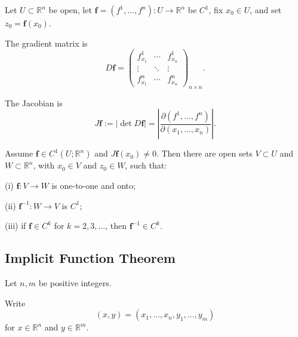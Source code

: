 Let $U\subset\mathbb R^n$ be open, let $\mathbf f=(f^1,\ldots,f^n):U\to\mathbb R^n$ be $C^1$, fix $x_0\in U$, and set $z_0=\mathbf f(x_0)$.

\begin{definition}
\label{def:gradient-matrix-df-square-notation}

The gradient matrix is
\[
D\mathbf f=
\begin{pmatrix}
f^1_{x_1}&\cdots&f^1_{x_n}\\
\vdots&\ddots&\vdots\\
f^n_{x_1}&\cdots&f^n_{x_n}
\end{pmatrix}_{n\times n}.
\]
\end{definition}

\begin{definition}
\label{def:jacobian-jf}

The Jacobian is
\[
J\mathbf f
:=|\det D\mathbf f|
=\left|\frac{\partial(f^1,\ldots,f^n)}
{\partial(x_1,\ldots,x_n)}\right|.
\]
\end{definition}

\begin{theorem}
\label{thm:inverse-function-theorem}

Assume $\mathbf f\in C^1(U;\mathbb R^n)$ and $J\mathbf f(x_0)\ne0$. Then there are open sets $V\subset U$ and $W\subset\mathbb R^n$, with $x_0\in V$ and $z_0\in W$, such that:

(i) $\mathbf f:V\to W$ is one-to-one and onto;

(ii) $\mathbf f^{-1}:W\to V$ is $C^1$;

(iii) if $\mathbf f\in C^k$ for $k=2,3,\ldots$, then $\mathbf f^{-1}\in C^k$.
\end{theorem}

\subsection{Implicit Function Theorem}

Let $n,m$ be positive integers.

\begin{definition}
\label{def:xy-point-notation-rnm}
Write
\[
(x,y)=(x_1,\ldots,x_n,y_1,\ldots,y_m)
\]
for $x\in\mathbb R^n$ and $y\in\mathbb R^m$.
\end{definition}

